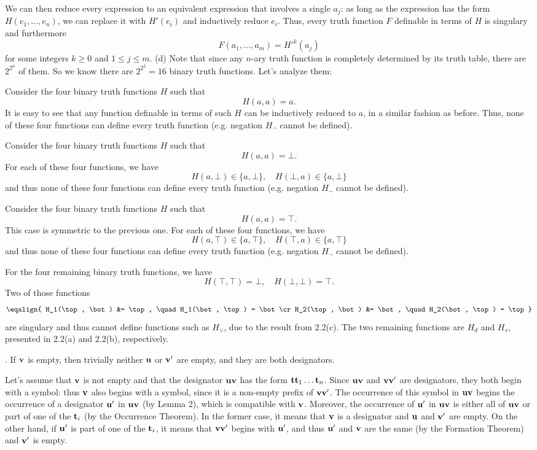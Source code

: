 We can then reduce every expression to an equivalent expression that 
involves a single $a_j$: as long as the expression has the form $H(e_1, \dots, e_n)$,
we can replace it with $H'(e_i)$ and inductively reduce $e_i$. Thus, every truth 
function $F$ definable in terms of $H$ is singulary and furthermore
$$
F(a_1, \dots, a_m) = {H'}^k(a_j)
$$
for some integers $k \ge 0$ and $1 \le j \le m$.
\smallskip
\ansitem (d) Note that since any $n$-ary truth function is completely 
determined by its truth table, there are $2^{2^n}$ of them. So we know
there are $2^{2^2}=16$ binary truth functions. Let's analyze them:

\itemitem{-} Consider the four binary truth functions $H$ such that
$$
H(a, a) = a.
$$
It is easy to see that any function definable in terms of such $H$ can be 
inductively reduced to $a$, in a similar fashion as before. Thus, none of these four
functions can define every truth function (e.g. negation $H_{\neg}$ cannot
be defined).

\itemitem{-} Consider the four binary truth functions $H$ such that
$$
H(a,a) = \bot.
$$
For each of these four functions, we have
$$
H(a,\bot) \in \{a, \bot\}, \quad H(\bot, a) \in \{a, \bot\}
$$
and thus none of these four functions can define every truth function (e.g. 
negation $H_{\neg}$ cannot be defined).

\itemitem{-} Consider the four binary truth functions $H$ such that
$$
H(a,a) = \top.
$$
This case is symmetric to the previous one. For each of these four functions, we have
$$
H(a,\top) \in \{a, \top\}, \quad H(\top, a) \in \{a, \top\}
$$
and thus none of these four functions can define every truth function (e.g. 
negation $H_{\neg}$ cannot be defined).

\itemitem{-} For the four remaining binary truth functions, we have
$$
H(\top, \top) = \bot, \quad H(\bot, \bot) = \top.
$$
Two of those functions
$$\eqalign{
H_1(\top, \bot) &= \top, \quad H_1(\bot, \top) = \bot\cr
H_2(\top, \bot) &= \bot, \quad H_2(\bot, \top) = \top}
$$
are singulary and thus cannot define functions such as $H_{\lor}$, 
due to the result from 2.2(c). The two remaining functions are 
$H_d$ and $H_s$, presented in 2.2(a) and 2.2(b), respectively.
\medskip

. If ${\bf v}$ is empty, then trivially neither ${\bf u}$ or ${\bf v}'$ are empty, 
and they are both designators.

Let's assume that ${\bf v}$ is not empty and that the designator ${\bf u}{\bf v}$ has the form
${\bf t t}_1 \dots {\bf t}_n$. Since ${\bf u}{\bf v}$ and ${\bf v}{\bf v}'$ are 
designators, they both begin with a symbol: thus ${\bf v}$ also begins with a symbol, since it
is a non-empty prefix of ${\bf v}{\bf v}'$. The occurrence of this symbol in ${\bf u}{\bf v}$ 
begins the occurrence of a designator ${\bf u}'$ in ${\bf u}{\bf v}$ (by Lemma 2), which is 
compatible with ${\bf v}$. Moreover, the occurrence of ${\bf u}'$ in ${\bf u}{\bf v}$ is either 
all of ${\bf u}{\bf v}$ or part of one of the ${\bf t}_i$ (by the Occurrence Theorem). In the 
former case, it means that ${\bf v}$ is a designator and ${\bf u}$ and ${\bf v}'$ are 
empty. On the other hand, if ${\bf u}'$ is part of one of the ${\bf t}_i$, it means that
${\bf v}{\bf v}'$ begins with ${\bf u}'$, and thus ${\bf u}'$ and ${\bf v}$ are the same
(by the Formation Theorem) and ${\bf v}'$ is empty.
\medskip

